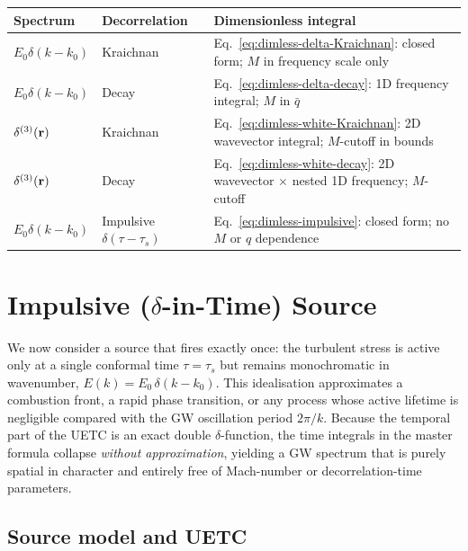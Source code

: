 \documentclass[10pt,prd,aps,nobibnotes,superscriptaddress,preprintnumbers,notitlepage]{revtex4-1}
\newcommand{\br}{{\bf r}}
\begin{document}
\begin{center}
\begin{tabular}{lll}
\hline
Spectrum & Decorrelation & Dimensionless integral \\
\hline
$E_0\delta(k-k_0)$ & Kraichnan & Eq.~\eqref{eq:dimless-delta-Kraichnan}: closed form; $M$ in frequency scale only \\
$E_0\delta(k-k_0)$ & Decay & Eq.~\eqref{eq:dimless-delta-decay}: 1D frequency integral; $M$ in $\bar q$ \\
$\delta^{(3)}(\br)$ & Kraichnan & Eq.~\eqref{eq:dimless-white-Kraichnan}: 2D wavevector integral; $M$-cutoff in bounds \\
$\delta^{(3)}(\br)$ & Decay & Eq.~\eqref{eq:dimless-white-decay}: 2D wavevector $\times$ nested 1D frequency; $M$-cutoff \\
$E_0\delta(k-k_0)$ & Impulsive $\delta(\tau-\tau_s)$ & Eq.~\eqref{eq:dimless-impulsive}: closed form; no $M$ or $q$ dependence \\
\hline
\end{tabular}
\end{center}
\section{Impulsive ($\delta$-in-Time) Source}
\label{sec:impulsive}

We now consider a source that fires exactly once: the turbulent stress is active
only at a single conformal time $\tau=\tau_s$ but remains monochromatic in
wavenumber, $E(k)=E_0\,\delta(k-k_0)$. This idealisation approximates a
combustion front, a rapid phase transition, or any process whose active lifetime
is negligible compared with the GW oscillation period $2\pi/k$. Because the
temporal part of the UETC is an exact double $\delta$-function, the time
integrals in the master formula collapse \emph{without approximation}, yielding
a GW spectrum that is purely spatial in character and entirely free of
Mach-number or decorrelation-time parameters.

\subsection{Source model and UETC}
\label{sec:impulsive-uetc}
\end{document}
